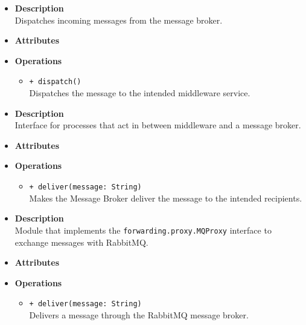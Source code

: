 \FloatBarrier
\begin{itemize}
  \item \textbf{Description} \\
    Dispatches incoming messages from the message broker.
  \item \textbf{Attributes}
  \item \textbf{Operations}
  \begin{itemize}
    \item \texttt{+ dispatch()} \\
    Dispatches the message to the intended middleware service.
  \end{itemize}
\end{itemize}

\FloatBarrier
\begin{itemize}
  \item \textbf{Description} \\
    Interface for processes that act in between middleware and a message
    broker.
  \item \textbf{Attributes}
  \item \textbf{Operations}
  \begin{itemize}
    \item \texttt{+ deliver(message: String)} \\
    Makes the Message Broker deliver the message to the intended recipients.
  \end{itemize}
\end{itemize}

\FloatBarrier
\begin{itemize}
  \item \textbf{Description} \\
    Module that implements the \texttt{forwarding.proxy.MQProxy}
    interface to exchange messages with RabbitMQ.
  \item \textbf{Attributes}
  \item \textbf{Operations}
  \begin{itemize}
    \item \texttt{+ deliver(message: String)} \\
    Delivers a message through the RabbitMQ message broker.
  \end{itemize}
\end{itemize}
